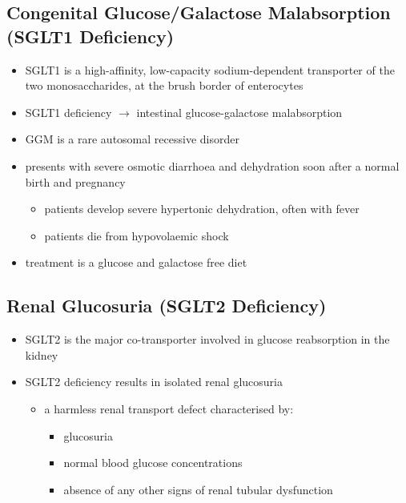 \documentclass{scrartcl}
\begin{document}
\subsection{Congenital Glucose/Galactose Malabsorption (SGLT1 Deficiency)}
\label{sec:orgace8c82}
\begin{itemize}
\item SGLT1 is a high-affinity, low-capacity sodium-dependent transporter
of the two monosaccharides, at the brush border of enterocytes
\item SGLT1 deficiency \(\to\) intestinal glucose-galactose malabsorption
\item GGM is a rare autosomal recessive disorder
\item presents with severe osmotic diarrhoea and dehydration soon after a
normal birth and pregnancy
\begin{itemize}
\item patients develop severe hypertonic dehydration, often with fever
\item patients die from hypovolaemic shock
\end{itemize}
\item treatment is a glucose and galactose free diet
\end{itemize}

\subsection{Renal Glucosuria (SGLT2 Deficiency)}
\label{sec:orgbbfc7d8}
\begin{itemize}
\item SGLT2 is the major co-transporter involved in glucose reabsorption in
the kidney
\item SGLT2 deficiency results in isolated renal glucosuria
\begin{itemize}
\item a harmless renal transport defect characterised by:
\begin{itemize}
\item glucosuria
\item normal blood glucose concentrations
\item absence of any other signs of renal tubular dysfunction
\end{itemize}
\end{itemize}
\end{itemize}
\end{document}
